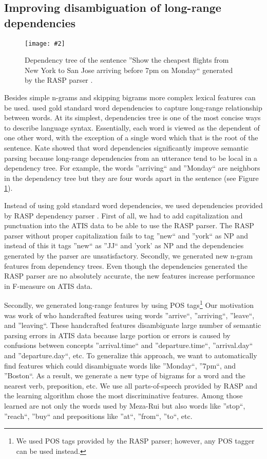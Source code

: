 \documentclass[11pt]{article}
\newcommand{\fgrparam}[4]{
  \begin{figure}[htbp]
    \begin{center}
      \leavevmode
      \texttt{[image: \#2]}
    \end{center}
    \caption{#4}
    \label{#3}
  \end{figure}
}
\begin{document}
\subsection{Improving disambiguation of long-range dependencies}

\fgrparam{width=8cm}{./fig/dep-tree.pdf}{fig:dep:tree}{Dependency tree of the sentence ''Show the cheapest flights from New York to San Jose arriving before 7pm on Monday`` generated by the RASP parser \cite{rasp06}.}

Besides simple n-grams and skipping bigrams more complex lexical features can be used. \cite{kate08} used gold standard word dependencies to capture long-range relationship between words. At its simplest, dependencies tree is one of the most concise ways to describe language syntax. Essentially, each word is viewed as the dependent of one other word, with the exception of a single word which that is the root of the sentence. Kate showed that word dependencies significantly improve semantic parsing because long-range dependencies from an utterance tend to be local in a dependency tree. For example, the words ''arriving`` and ''Monday`` are neighbors in the dependency tree but they are four words apart in the sentence (see Figure \ref{fig:dep:tree}).

Instead of using gold standard word dependencies, we used dependencies provided by RASP dependency parser \cite{rasp06}. First of all, we had to add capitalization and punctuation into the ATIS data to be able to use the RASP parser. The RASP parser without proper capitalization fails to tag ''new`` and ''york`` as NP and instead of this it tags ''new`` as ''JJ`` and 'york' as NP and the dependencies generated by the parser are unsatisfactory. Secondly, we generated new n-gram features from dependency trees. Even though the dependencies generated the RASP parser are no absolutely accurate, the new features increase performance in F-measure on ATIS data. 

Secondly, we generated long-range features by using POS tags\footnote{We used POS tags provided by the RASP parser; however, any POS tagger can be used instead.} 
Our motivation was work of \cite{meza08a,meza08b} who handcrafted features using words ''arrive``, ''arriving``, ''leave``, and ''leaving``. These handcrafted features disambiguate large number of semantic parsing errors in ATIS data because large portion or errors is caused by confusions between concepts ''arrival.time`` and ''departure.time``, ''arrival.day`` and ''departure.day``, etc. To generalize this approach, we want to automatically find features which could disambiguate words like ''Monday``, ''7pm``, and ''Boston``. As a result, we generate a new type of bigrams for a word and the nearest verb, preposition, etc. We use all parts-of-speech provided by RASP and the learning algorithm chose the most discriminative features. Among those learned are not only the words used by Meza-Rui but also words like ''stop``, ''reach``, ''buy`` and prepositions like ''at``, ''from``, ''to``, etc.
\end{document}
